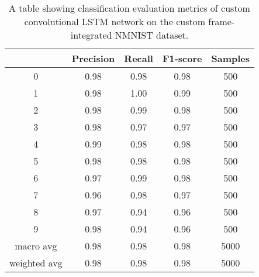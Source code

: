 \begin{table}[htb]
    \centering
    \begin{tabular}{|| c | c | c | c | c ||}
        \hline
             & Precision & Recall & F1-score & Samples \\
        \hline \hline
        0            & 0.98 & 0.98 & 0.98 & 500  \\
        \hline
        1            & 0.98 & 1.00 & 0.99 & 500  \\
        \hline
        2            & 0.98 & 0.99 & 0.98 & 500  \\
        \hline
        3            & 0.98 & 0.97 & 0.97 & 500  \\
        \hline
        4            & 0.99 & 0.98 & 0.98 & 500  \\
        \hline
        5            & 0.98 & 0.98 & 0.98 & 500  \\
        \hline
        6            & 0.97 & 0.99 & 0.98 & 500  \\
        \hline
        7            & 0.96 & 0.98 & 0.97 & 500  \\
        \hline
        8            & 0.97 & 0.94 & 0.96 & 500  \\
        \hline
        9            & 0.98 & 0.94 & 0.96 & 500  \\
        \hline
        macro avg    & 0.98 & 0.98 & 0.98 & 5000 \\
        \hline
        weighted avg & 0.98 & 0.98 & 0.98 & 5000 \\
        \hline
    \end{tabular}
    \caption{A table showing classification evaluation metrics of custom convolutional LSTM network on the custom frame-integrated NMNIST dataset.}
    \label{tab:custom_conv_lstm_nmnist_custom_frame_evaluation_metrics}
\end{table}

